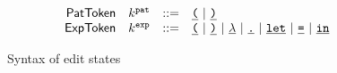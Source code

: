\begin{figure}
\[\begin{array}{rlrl}
      \mathsf{PatToken} & k^{\texttt{pat}} & ::= &
        \underline{\texttt{(}} ~\vert~
        \underline{\texttt{)}} \\
      \mathsf{ExpToken} & k^{\texttt{exp}} & ::= &
        \underline{\texttt{(}} ~\vert~
        \underline{\texttt{)}} ~\vert~
        \underline{\lambda} ~\vert~
        \underline{\texttt{.}} ~\vert~
        \underline{\texttt{let}} ~\vert~
        \underline{\texttt{=}} ~\vert~
        \underline{\texttt{in}}
  \end{array}\]
  \caption{
    Syntax of edit states 
  }
  \label{fig:edit-state-syntax}
\end{figure}